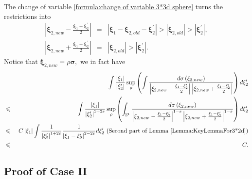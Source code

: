 \documentclass[reqno]{amsart}
\theoremstyle{plain}
\numberwithin{equation}{section}
\begin{document}
The change of variable \ref{formula:change of variable 3*3d sphere} turns
the restrictions into 
\begin{eqnarray*}
\left\vert \mathbf{\xi }_{2,new}-\frac{\mathbf{\xi }_{1}-\mathbf{\xi }_{2}^{\prime }}{2}\right\vert &=&\left\vert \mathbf{\xi }_{1}-\mathbf{\xi }_{2,old}-\mathbf{\xi }_{2}^{\prime }\right\vert >\left\vert \mathbf{\xi }_{2,old}\right\vert >\left\vert \mathbf{\xi }_{2}^{\prime }\right\vert , \\
\left\vert \mathbf{\xi }_{2,new}+\frac{\mathbf{\xi }_{1}-\mathbf{\xi }_{2}^{\prime }}{2}\right\vert &=&\left\vert \mathbf{\xi }_{2,old}\right\vert
>\left\vert \mathbf{\xi }_{2}^{\prime }\right\vert .
\end{eqnarray*}Notice that $\mathbf{\mathbf{\xi }}_{2,new}\mathbf{=}\rho \mathbf{\sigma ,}$
we in fact have\begin{eqnarray*}
&&\int \frac{\left\vert \mathbf{\xi }_{1}\right\vert }{\left\vert \mathbf{\xi }_{2}^{\prime }\right\vert }\sup_{\rho }\left( \int \frac{d\mathbf{\sigma }\left( \mathbf{\xi }_{2,new}\right) }{\left\vert \mathbf{\xi }_{2,new}-\frac{\mathbf{\xi }_{1}-\mathbf{\xi }_{2}^{\prime }}{2}\right\vert
\left\vert \mathbf{\xi }_{2,new}+\frac{\mathbf{\xi }_{1}-\mathbf{\xi }_{2}^{\prime }}{2}\right\vert }\right) d\mathbf{\xi }_{2}^{\prime } \\
&\leqslant &\int \frac{\left\vert \mathbf{\xi }_{1}\right\vert }{\left\vert 
\mathbf{\xi }_{2}^{\prime }\right\vert ^{1+2\varepsilon }}\sup_{\rho }\left(
\int_{\mathbb{S}^{1}}\frac{d\mathbf{\sigma }\left( \mathbf{\xi }_{2,new}\right) }{\left\vert \mathbf{\xi }_{2,new}-\frac{\mathbf{\xi }_{1}-\mathbf{\xi }_{2}^{\prime }}{2}\right\vert ^{1-\varepsilon }\left\vert 
\mathbf{\xi }_{2,new}+\frac{\mathbf{\xi }_{1}-\mathbf{\xi }_{2}^{\prime }}{2}\right\vert ^{1-\varepsilon }}\right) d\mathbf{\xi }_{2}^{\prime } \\
&\leqslant &\text{ }C\left\vert \mathbf{\xi }_{1}\right\vert \int \frac{1}{\left\vert \mathbf{\xi }_{2}^{\prime }\right\vert ^{1+2\varepsilon }}\frac{1}{\left\vert \mathbf{\xi }_{1}-\mathbf{\xi }_{2}^{\prime }\right\vert
^{2-2\varepsilon }}d\mathbf{\xi }_{2}^{\prime }\text{ (Second part of Lemma \ref{Lemma:KeyLemmaFor3*2d})} \\
&\leqslant &C.
\end{eqnarray*}

\subsection{Proof of Case II}
\end{document}
